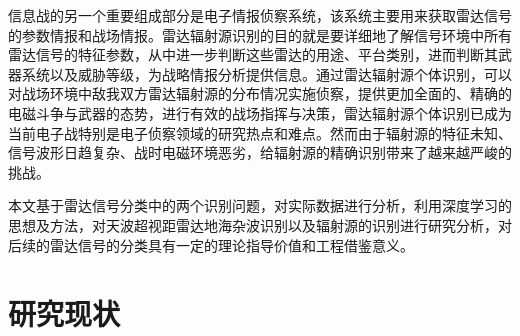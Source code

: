信息战的另一个重要组成部分是电子情报侦察系统，该系统主要用来获取雷达信号的参数情报和战场情报。雷达辐射源识别的目的就是要详细地了解信号环境中所有雷达信号的特征参数，从中进一步判断这些雷达的用途、平台类别，进而判断其武器系统以及威胁等级，为战略情报分析提供信息。通过雷达辐射源个体识别，可以对战场环境中敌我双方雷达辐射源的分布情况实施侦察，提供更加全面的、精确的电磁斗争与武器的态势，进行有效的战场指挥与决策，雷达辐射源个体识别已成为当前电子战特别是电子侦察领域的研究热点和难点\cite{matuszewski2008specific}。然而由于辐射源的特征未知、信号波形日趋复杂、战时电磁环境恶劣，给辐射源的精确识别带来了越来越严峻的挑战。

本文基于雷达信号分类中的两个识别问题，对实际数据进行分析，利用深度学习的思想及方法，对天波超视距雷达地海杂波识别以及辐射源的识别进行研究分析，对后续的雷达信号的分类具有一定的理论指导价值和工程借鉴意义。

\section{研究现状}
